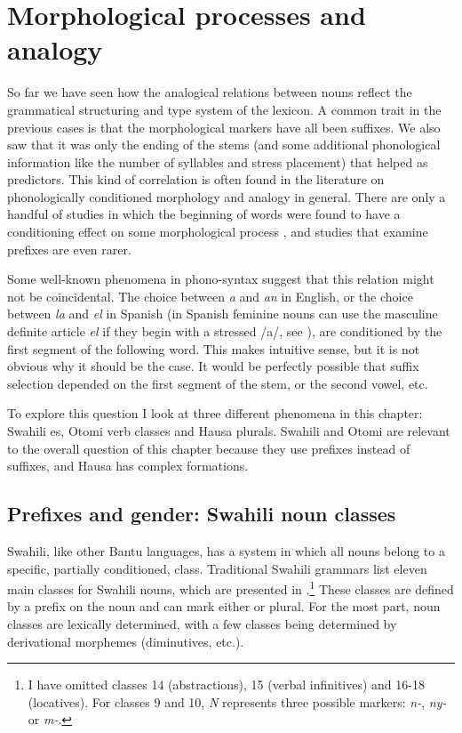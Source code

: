 \chapter{Morphological processes and analogy}\label{chap:structural}

So far we have seen how the analogical relations between nouns reflect the grammatical structuring and type system of the lexicon. A common trait in the previous cases is that the morphological markers have all been suffixes. We also saw that it was only the ending of the stems (and some additional phonological information like the number of syllables and stress placement) that helped as predictors. This kind of correlation is often found in the literature on phonologically conditioned morphology and analogy in general. There are only a handful of studies in which the beginning of words were found to have a conditioning effect on some morphological process \autocite{Bybee.1982, Kopcke.1984}, and studies that examine prefixes are even rarer.

Some well-known phenomena in phono-syntax suggest that this relation might not be coincidental. The choice between \textit{a} and \textit{an} in English, or the choice between \textit{la} and \textit{el} in Spanish (in Spanish feminine nouns can use the masculine definite article \textit{el} if they begin with a stressed /a/, see \citealt{Harris.1987}), are conditioned by the first segment of the following word. This makes intuitive sense, but it is not obvious why it should be the case. It would be perfectly possible that suffix selection depended on the first segment of the stem, or the second vowel, etc.

To explore this question I look at three different phenomena in this chapter: Swahili es, Otomi verb classes and Hausa plurals. Swahili and Otomi are relevant to the overall question of this chapter because they use prefixes instead of suffixes, and Hausa has complex  formations. %

\section{Prefixes and gender: Swahili noun classes}


Swahili, like other Bantu languages, has a  
system in which all nouns belong to a specific, partially conditioned, class. Traditional Swahili grammars list eleven main classes for Swahili nouns, which are presented in .\footnote{I have omitted classes 14 (abstractions), 15 (verbal infinitives) and 16-18 (locatives). For classes 9 and 10, \textit{N} represents three possible markers: \textit{n-}, \textit{ny-} or \textit{m-}.} These classes are defined by a prefix on the noun and can mark either  or plural. For the most part, noun classes are lexically determined, with a few classes being determined by derivational morphemes (diminutives, etc.). %

